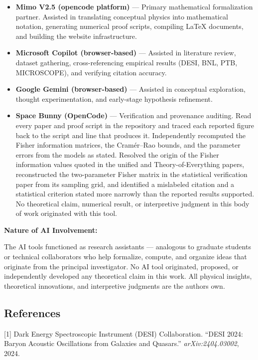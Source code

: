 \documentclass[
  10pt,
]{article}
\providecommand{\tightlist}{%
  \setlength{\itemsep}{0pt}\setlength{\parskip}{0pt}}
\begin{document}
\begin{itemize}
\tightlist
\item
  \textbf{Mimo V2.5 (opencode platform)} --- Primary mathematical
  formalization partner. Assisted in translating conceptual physics into
  mathematical notation, generating numerical proof scripts, compiling
  LaTeX documents, and building the website infrastructure.
\item
  \textbf{Microsoft Copilot (browser-based)} --- Assisted in literature
  review, dataset gathering, cross-referencing empirical results (DESI,
  BNL, PTB, MICROSCOPE), and verifying citation accuracy.
\item
  \textbf{Google Gemini (browser-based)} --- Assisted in conceptual
  exploration, thought experimentation, and early-stage hypothesis
  refinement.
\item
  \textbf{Space Bunny (OpenCode)} --- Verification and provenance
  auditing. Read every paper and proof script in the repository and
  traced each reported figure back to the script and line that produces
  it. Independently recomputed the Fisher information matrices, the
  Cramér--Rao bounds, and the parameter errors from the models as
  stated. Resolved the origin of the Fisher information values quoted in
  the unified and Theory-of-Everything papers, reconstructed the
  two-parameter Fisher matrix in the statistical verification paper from
  its sampling grid, and identified a mislabeled citation and a
  statistical criterion stated more narrowly than the reported results
  supported. No theoretical claim, numerical result, or interpretive
  judgment in this body of work originated with this tool.
\end{itemize}

\textbf{Nature of AI Involvement:}

The AI tools functioned as research assistants --- analogous to graduate
students or technical collaborators who help formalize, compute, and
organize ideas that originate from the principal investigator. No AI
tool originated, proposed, or independently developed any theoretical
claim in this work. All physical insights, theoretical innovations, and
interpretive judgments are the author\textquotesingle s own.

\hypertarget{references}{%
\subsection{References}\label{references}}

{[}1{]} Dark Energy Spectroscopic Instrument (DESI) Collaboration.
``DESI 2024: Baryon Acoustic Oscillations from Galaxies and Quasars.''
\emph{arXiv:2404.03002}, 2024.
\end{document}
